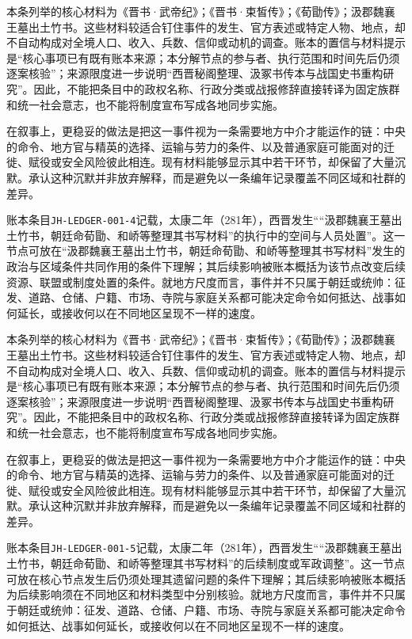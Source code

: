 本条列举的核心材料为《晋书·武帝纪》；《晋书·束皙传》；《荀勖传》；汲郡魏襄王墓出土竹书。这些材料较适合钉住事件的发生、官方表述或特定人物、地点，却不自动构成对全境人口、收入、兵数、信仰或动机的调查。账本的置信与材料提示是“核心事项已有既有账本来源；本分解节点的参与者、执行范围和时间先后仍须逐案核验”；来源限度进一步说明“西晋秘阁整理、汲冢书传本与战国史书重构研究”。因此，不能把条目中的政权名称、行政分类或战报修辞直接转译为固定族群和统一社会意志，也不能将制度宣布写成各地同步实施。

在叙事上，更稳妥的做法是把这一事件视为一条需要地方中介才能运作的链：中央的命令、地方官与精英的选择、运输与劳力的条件、以及普通家庭可能面对的迁徙、赋役或安全风险彼此相连。现有材料能够显示其中若干环节，却保留了大量沉默。承认这种沉默并非放弃解释，而是避免以一条编年记录覆盖不同区域和社群的差异。

账本条目\texttt{JH-LEDGER-001-4}记载，太康二年（281年），西晋发生““汲郡魏襄王墓出土竹书，朝廷命荀勖、和峤等整理其书写材料”的执行中的空间与人员处置”。这一节点可放在“汲郡魏襄王墓出土竹书，朝廷命荀勖、和峤等整理其书写材料”发生的政治与区域条件共同作用的条件下理解；其后续影响被账本概括为该节点改变后续资源、联盟或制度处置的条件。就地方尺度而言，事件并不只属于朝廷或统帅：征发、道路、仓储、户籍、市场、寺院与家庭关系都可能决定命令如何抵达、战事如何延长，或接收何以在不同地区呈现不一样的速度。

本条列举的核心材料为《晋书·武帝纪》；《晋书·束皙传》；《荀勖传》；汲郡魏襄王墓出土竹书。这些材料较适合钉住事件的发生、官方表述或特定人物、地点，却不自动构成对全境人口、收入、兵数、信仰或动机的调查。账本的置信与材料提示是“核心事项已有既有账本来源；本分解节点的参与者、执行范围和时间先后仍须逐案核验”；来源限度进一步说明“西晋秘阁整理、汲冢书传本与战国史书重构研究”。因此，不能把条目中的政权名称、行政分类或战报修辞直接转译为固定族群和统一社会意志，也不能将制度宣布写成各地同步实施。

在叙事上，更稳妥的做法是把这一事件视为一条需要地方中介才能运作的链：中央的命令、地方官与精英的选择、运输与劳力的条件、以及普通家庭可能面对的迁徙、赋役或安全风险彼此相连。现有材料能够显示其中若干环节，却保留了大量沉默。承认这种沉默并非放弃解释，而是避免以一条编年记录覆盖不同区域和社群的差异。

账本条目\texttt{JH-LEDGER-001-5}记载，太康二年（281年），西晋发生““汲郡魏襄王墓出土竹书，朝廷命荀勖、和峤等整理其书写材料”的后续制度或军政调整”。这一节点可放在核心节点发生后仍须处理其遗留问题的条件下理解；其后续影响被账本概括为后续影响须在不同地区和材料类型中分别核验。就地方尺度而言，事件并不只属于朝廷或统帅：征发、道路、仓储、户籍、市场、寺院与家庭关系都可能决定命令如何抵达、战事如何延长，或接收何以在不同地区呈现不一样的速度。

